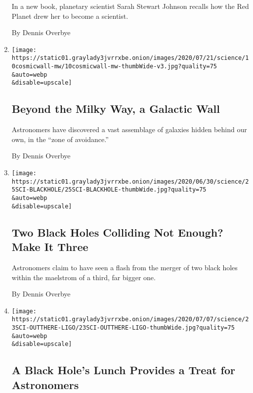 \begin{enumerate}
  In a new book, planetary scientist Sarah Stewart Johnson recalls how
  the Red Planet drew her to become a scientist.

  By Dennis Overbye
\item
  \href{/2020/07/10/science/astronomy-galaxies-attractor-universe.html}{}

  \texttt{[image: https://static01.graylady3jvrrxbe.onion/images/2020/07/21/science/10cosmicwall-mw/10cosmicwall-mw-thumbWide-v3.jpg?quality=75\\\&auto=webp\\\&disable=upscale]}

  \hypertarget{beyond-the-milky-way-a-galactic-wall}{%
  \subsection{Beyond the Milky Way, a Galactic
  Wall}\label{beyond-the-milky-way-a-galactic-wall}}

  Astronomers have discovered a vast assemblage of galaxies hidden
  behind our own, in the ``zone of avoidance.''

  By Dennis Overbye
\item
  \href{/2020/06/25/science/black-hole-collision-ligo.html}{}

  \texttt{[image: https://static01.graylady3jvrrxbe.onion/images/2020/06/30/science/25SCI-BLACKHOLE/25SCI-BLACKHOLE-thumbWide.jpg?quality=75\\\&auto=webp\\\&disable=upscale]}

  \hypertarget{two-black-holes-colliding-not-enough-make-it-three}{%
  \subsection{Two Black Holes Colliding Not Enough? Make It
  Three}\label{two-black-holes-colliding-not-enough-make-it-three}}

  Astronomers claim to have seen a flash from the merger of two black
  holes within the maelstrom of a third, far bigger one.

  By Dennis Overbye
\item
  \href{/2020/06/24/science/black-hole-ligo-gravitational.html}{}

  \texttt{[image: https://static01.graylady3jvrrxbe.onion/images/2020/07/07/science/23SCI-OUTTHERE-LIGO/23SCI-OUTTHERE-LIGO-thumbWide.jpg?quality=75\\\&auto=webp\\\&disable=upscale]}

  \hypertarget{a-black-holes-lunch-provides-a-treat-for-astronomers}{%
  \subsection{A Black Hole's Lunch Provides a Treat for
  Astronomers}\label{a-black-holes-lunch-provides-a-treat-for-astronomers}}


\end{enumerate}
